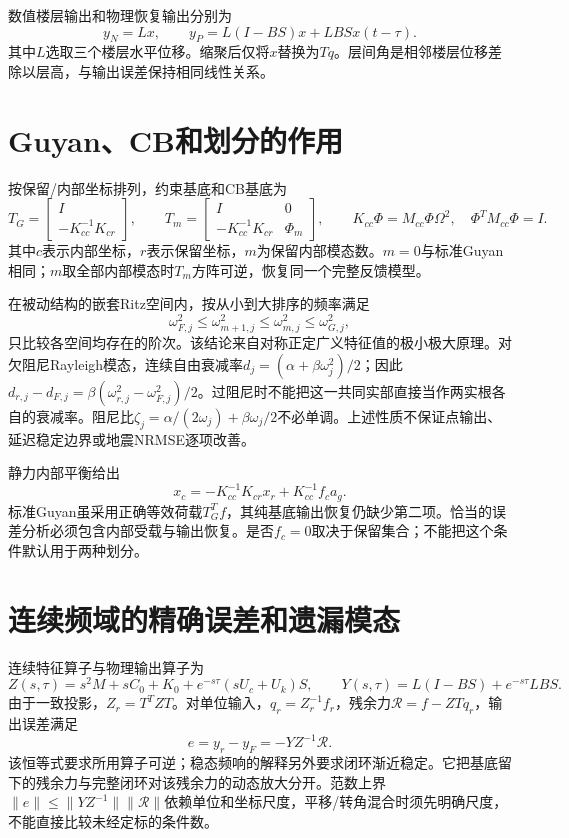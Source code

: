 \documentclass[UTF8,11pt,a4paper]{ctexart}
\begin{document}
数值楼层输出和物理恢复输出分别为
\begin{equation}\label{eq:output}
 y_N=Lx,\qquad y_P=L(I-BS)x+LB Sx(t-\tau).
\end{equation}
其中$L$选取三个楼层水平位移。缩聚后仅将$x$替换为$Tq$。层间角是相邻楼层位移差除以层高，与输出误差保持相同线性关系。

\section{Guyan、CB和划分的作用}
按保留/内部坐标排列，约束基底和CB基底为
\begin{equation}\label{eq:basis}
 T_G=\begin{bmatrix}I\\-K_{cc}^{-1}K_{cr}\end{bmatrix},\qquad
 T_m=\begin{bmatrix}I&0\\-K_{cc}^{-1}K_{cr}&\Phi_m\end{bmatrix},\qquad
 K_{cc}\Phi=M_{cc}\Phi\Omega^2,\quad\Phi^TM_{cc}\Phi=I.
\end{equation}
其中$c$表示内部坐标，$r$表示保留坐标，$m$为保留内部模态数。$m=0$与标准Guyan相同；$m$取全部内部模态时$T_m$方阵可逆，恢复同一个完整反馈模型。

在被动结构的嵌套Ritz空间内，按从小到大排序的频率满足
\begin{equation}\label{eq:ritz}
 \omega_{F,j}^2\leq\omega_{m+1,j}^2\leq\omega_{m,j}^2\leq\omega_{G,j}^2,
\end{equation}
只比较各空间均存在的阶次。该结论来自对称正定广义特征值的极小极大原理。对欠阻尼Rayleigh模态，连续自由衰减率$d_j=(\alpha+\beta\omega_j^2)/2$；因此$d_{r,j}-d_{F,j}=\beta(\omega_{r,j}^2-\omega_{F,j}^2)/2$。过阻尼时不能把这一共同实部直接当作两实根各自的衰减率。阻尼比$\zeta_j=\alpha/(2\omega_j)+\beta\omega_j/2$不必单调。上述性质不保证点输出、延迟稳定边界或地震NRMSE逐项改善。

静力内部平衡给出
\begin{equation}\label{eq:staticload}
 x_c=-K_{cc}^{-1}K_{cr}x_r+K_{cc}^{-1}f_c a_g.
\end{equation}
标准Guyan虽采用正确等效荷载$T_G^Tf$，其纯基底输出恢复仍缺少第二项。恰当的误差分析必须包含内部受载与输出恢复。是否$ f_c=0$取决于保留集合；不能把这个条件默认用于两种划分。

\section{连续频域的精确误差和遗漏模态}
连续特征算子与物理输出算子为
\begin{equation}\label{eq:continuous}
 Z(s,\tau)=s^2M+sC_0+K_0+e^{-s\tau}(sU_c+U_k)S,\qquad
 Y(s,\tau)=L(I-BS)+e^{-s\tau}LBS.
\end{equation}
由于一致投影，$Z_r=T^TZT$。对单位输入，$q_r=Z_r^{-1}f_r$，残余力$\mathcal R=f-ZTq_r$，输出误差满足
\begin{equation}\label{eq:residual}
 e=y_r-y_F=-YZ^{-1}\mathcal R.
\end{equation}
该恒等式要求所用算子可逆；稳态频响的解释另外要求闭环渐近稳定。它把基底留下的残余力与完整闭环对该残余力的动态放大分开。范数上界$\|e\|\leq\|YZ^{-1}\|\|\mathcal R\|$依赖单位和坐标尺度，平移/转角混合时须先明确尺度，不能直接比较未经定标的条件数。
\end{document}
